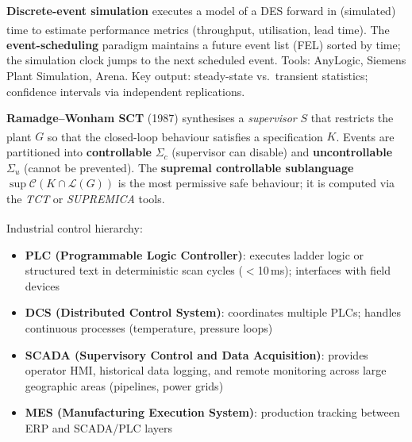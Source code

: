 \begin{tcbitemize}[ skin=sectionraster ]
    \tcbitem[title={Discrete-Event Simulation (DES)}, raster multicolumn=3]
    \textbf{Discrete-event simulation} executes a model of a DES forward in (simulated) time to estimate performance metrics (throughput, utilisation, lead time)\textsuperscript{\cite[][pp.~360--400]{cassandrasIntroductionDiscreteEvent2009}}.
    The \textbf{event-scheduling} paradigm maintains a future event list (FEL) sorted by time; the simulation clock jumps to the next scheduled event.
    Tools: AnyLogic, Siemens Plant Simulation, Arena.
    Key output: steady-state vs.\ transient statistics; confidence intervals via independent replications.

    \tcbitem[title={Supervisory Control Theory (SCT)}, raster multicolumn=3]
    \textbf{Ramadge--Wonham SCT} (1987) synthesises a \emph{supervisor} $S$ that restricts the plant $G$ so that the closed-loop behaviour satisfies a specification $K$\textsuperscript{\cite[][pp.~250--256]{liuSupervisoryControlTheory2019}}.
    Events are partitioned into \textbf{controllable} $\Sigma_c$ (supervisor can disable) and \textbf{uncontrollable} $\Sigma_u$ (cannot be prevented).
    The \textbf{supremal controllable sublanguage} $\sup\mathcal{C}(K \cap \mathcal{L}(G))$ is the most permissive safe behaviour; it is computed via the \emph{TCT} or \emph{SUPREMICA} tools.

    \tcbitem[title={SCADA and PLC Systems}, raster multicolumn=3]
    Industrial control hierarchy\textsuperscript{\cite[][pp.~60--80]{manesissIntroductionIndustrialAutomation2020}}:
    \begin{itemize}
        \item \textbf{PLC (Programmable Logic Controller)}: executes ladder logic or structured text in deterministic scan cycles ($<$10\,ms); interfaces with field devices
        \item \textbf{DCS (Distributed Control System)}: coordinates multiple PLCs; handles continuous processes (temperature, pressure loops)
        \item \textbf{SCADA (Supervisory Control and Data Acquisition)}: provides operator HMI, historical data logging, and remote monitoring across large geographic areas (pipelines, power grids)
        \item \textbf{MES (Manufacturing Execution System)}: production tracking between ERP and SCADA/PLC layers
    \end{itemize}
\end{tcbitemize}

